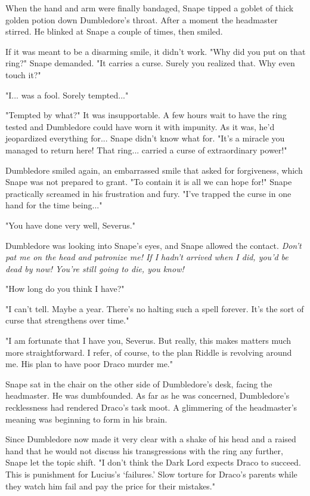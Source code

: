 \documentclass[a4paper,11pt]{article}
\begin{document}
When the hand and arm were finally bandaged, Snape tipped a goblet of thick golden potion down Dumbledore's throat. After a moment the headmaster stirred. He blinked at Snape a couple of times, then smiled.

If it was meant to be a disarming smile, it didn't work. "Why did you put on that ring?" Snape demanded. "It carries a curse. Surely you realized that. Why even touch it?"

"I... was a fool. Sorely tempted..."

"Tempted by what?" It was insupportable. A few hours wait to have the ring tested and Dumbledore could have worn it with impunity. As it was, he'd jeopardized everything for... Snape didn't know what for. "It's a miracle you managed to return here! That ring... carried a curse of extraordinary power!"

Dumbledore smiled again, an embarrassed smile that asked for forgiveness, which Snape was not prepared to grant. "To contain it is all we can hope for!" Snape practically screamed in his frustration and fury. "I've trapped the curse in one hand for the time being..."

"You have done very well, Severus."

Dumbledore was looking into Snape's eyes, and Snape allowed the contact. \emph{Don't pat me on the head and patronize me! If I hadn't arrived when I did, you'd be dead by now! You're still going to die, you know!}

"How long do you think I have?"

"I can't tell. Maybe a year. There's no halting such a spell forever. It's the sort of curse that strengthens over time."

"I am fortunate that I have you, Severus. But really, this makes matters much more straightforward. I refer, of course, to the plan Riddle is revolving around me. His plan to have poor Draco murder me."

Snape sat in the chair on the other side of Dumbledore's desk, facing the headmaster. He was dumbfounded. As far as he was concerned, Dumbledore's recklessness had rendered Draco's task moot. A glimmering of the headmaster's meaning was beginning to form in his brain.

Since Dumbledore now made it very clear with a shake of his head and a raised hand that he would not discuss his transgressions with the ring any further, Snape let the topic shift. "I don't think the Dark Lord expects Draco to succeed. This is punishment for Lucius's `failures.' Slow torture for Draco's parents while they watch him fail and pay the price for their mistakes."
\end{document}

